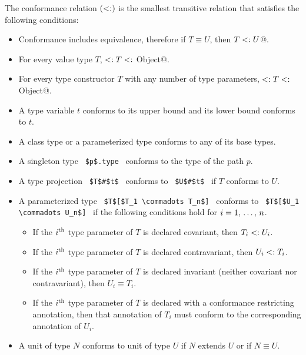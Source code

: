 The conformance relation $(<:)$ is the smallest transitive relation that satisfies the following conditions:

\begin{itemize}

\item
Conformance includes equivalence, therefore if $T \equiv U$, then \lstinline@$T <: U$@. 

\item
For every value type $T$, \lstinline@Nothing $<: T <:$ Object@. 

\item
For every type constructor $T$ with any number of type parameters, \lstinline@Nothing $<: T <:$ Object@. 

\item
A type variable $t$ conforms to its upper bound and its lower bound conforms to $t$. 

\item
A class type or a parameterized type conforms to any of its base types. 

\item 
A singleton type ~\lstinline!$p$.type!~ conforms to the type of the path $p$.

\item
A type projection ~\lstinline!$T$#$t$!~ conforms to ~\lstinline!$U$#$t$!~ if $T$ conforms to $U$. 

\item 
A parameterized type ~\lstinline!$T$[$T_1 \commadots T_n$]!~ conforms to ~\lstinline!$T$[$U_1 \commadots U_n$]!~ if the following conditions hold for $i = 1 ,\, \ldots ,\, n$.
\begin{itemize}
\item If the $i^{\mbox{\scriptsize th}}$ type parameter of $T$ is declared covariant, then $T_i <: U_i$.
\item If the $i^{\mbox{\scriptsize th}}$ type parameter of $T$ is declared contravariant, then $U_i <: T_i$.
\item If the $i^{\mbox{\scriptsize th}}$ type parameter of $T$ is declared invariant (neither covariant nor contravariant), then $U_i \equiv T_i$.
\item If the $i^{\mbox{\scriptsize th}}$ type parameter of $T$ is declared with a conformance restricting annotation, then that annotation of $T_i$ must conform to the corresponding annotation of $U_i$. 
\end{itemize}

\item
A unit of type $N$ conforms to unit of type $U$ if $N$ extends $U$ or if $N \equiv U$. 


\end{itemize}
